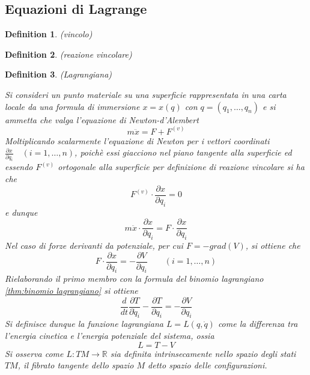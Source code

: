 \documentclass{article}
\newtheorem{definition}{Definition}[section]
\begin{document}
        \subsection{Equazioni di Lagrange}

            \begin{definition}(vincolo)
                        
            \end{definition}

            \begin{definition}(reazione vincolare)

            \end{definition}

            \begin{definition}(Lagrangiana)
                \label{def:Lagrangiana}

                Si consideri un punto materiale su una superficie rappresentata in una carta locale da una formula di immersione $x = x(q)$ con $q = (q_1, \dots, q_n)$ e si ammetta che valga 
                l'equazione di Newton-d'Alembert \[ m \ddot{x} = F + F^{(v)} \]
                Moltiplicando scalarmente l'equazione di Newton per i vettori coordinati $\frac{\partial x}{\partial q_i} \quad (i = 1, \dots, n) $, poichè essi giacciono nel piano tangente alla superficie 
                ed essendo $F^{(v)}$ ortogonale alla superficie per definizione di reazione vincolare si ha che \[ F^{(v)} \cdot \frac{\partial x}{\partial q_i} = 0 \]
                e dunque \[ m \ddot{x} \cdot \frac{\partial x}{\partial q_i} = F \cdot \frac{\partial x}{\partial q_i} \]
                Nel caso di forze derivanti da potenziale, per cui $ F = - grad(V) $, si ottiene che \[ F \cdot \frac{\partial x}{\partial q_i} = - \frac{\partial V}{\partial q_i} \quad \quad (i = 1, \dots, n) \]
                Rielaborando il primo membro con la formula del binomio lagrangiano \ref{thm:binomio lagrangiano} si ottiene 
                \[ \frac{d}{dt} \frac{\partial T}{\partial \dot{q}_i} - \frac{\partial T}{\partial q_i} = - \frac{\partial V}{\partial q_i} \] 
                Si definisce dunque la funzione lagrangiana $L = L(q, \dot{q})$ come la differenza tra l'energia cinetica e l'energia potenziale del sistema, ossia \[ L = T - V \]
                Si osserva come $L: TM \rightarrow \mathbb{R}$ sia definita intrinsecamente nello spazio degli stati $TM$, il fibrato tangente dello spazio $M$ detto spazio delle configurazioni. 
                
            \end{definition}
\end{document}
